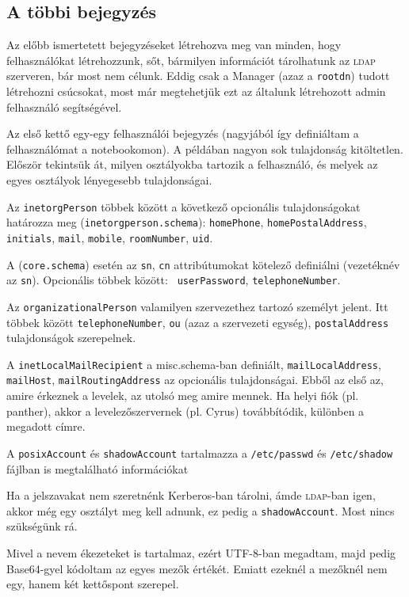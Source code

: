 \subsection{A többi bejegyzés}
Az előbb ismertetett bejegyzéseket létrehozva meg van minden, hogy felhasználókat létrehozzunk, sőt, bármilyen
információt tárolhatunk az \textsc{ldap} szerveren, bár most nem célunk. Eddig csak a Manager (azaz a \texttt{rootdn}) tudott
létrehozni csúcsokat, most már megtehetjük ezt az általunk létrehozott admin felhasználó segítségével.


Az első kettő egy-egy felhasználói bejegyzés (nagyjából így definiáltam a felhasználómat a notebookomon).
A példában nagyon sok tulajdonság kitöltetlen. Először tekintsük át, milyen osztályokba tartozik a felhasználó, és
melyek az egyes osztályok lényegesebb tulajdonságai.

Az \texttt{inetorgPerson} többek között a következő opcionális tulajdonságokat határozza meg
(\texttt{inetorgperson.schema}):
\texttt{homePhone}, \texttt{homePostalAddress}, \texttt{initials}, \texttt{mail},  \texttt{mobile},
\texttt{roomNumber}, \texttt{uid}.

A  (\texttt{core.schema}) esetén az \texttt{sn}, \texttt{cn} attribútumokat kötelező definiálni
(vezetéknév az \texttt{sn}). Opcionális többek között: \texttt{ userPassword}, \texttt{telephoneNumber}.

Az \texttt{organizationalPerson} valamilyen szervezethez tartozó személyt jelent. Itt többek között
\texttt{telephoneNumber}, \texttt{ou} (azaz a szervezeti egység), \texttt{postalAddress} tulajdonságok szerepelnek.

A \texttt{inetLocalMailRecipient} a misc.schema-ban definiált, \texttt{mailLocalAddress}, \texttt{mailHost},
\texttt{mailRoutingAddress} az opcionális tulajdonságai. Ebből az első az, amire érkeznek a levelek, az utolsó meg
amire mennek. Ha helyi fiók (pl. panther), akkor a levelezőszervernek (pl. Cyrus) továbbítódik, különben a megadott
címre.

A \texttt{posixAccount} és \texttt{shadowAccount} tartalmazza a \texttt{/etc/passwd} és \texttt{/etc/shadow} fájlban
is megtalálható információkat

Ha a jelszavakat nem szeretnénk Kerberos-ban tárolni, ámde \textsc{ldap}-ban igen, akkor még egy osztályt meg kell adnunk, ez
pedig a \texttt{shadowAccount}. Most nincs szükségünk rá.

Mivel a nevem ékezeteket is tartalmaz, ezért UTF-8-ban megadtam, majd pedig Base64-gyel kódoltam az egyes mezők
értékét. Emiatt ezeknél a mezőknél nem egy, hanem két kettőspont szerepel.

